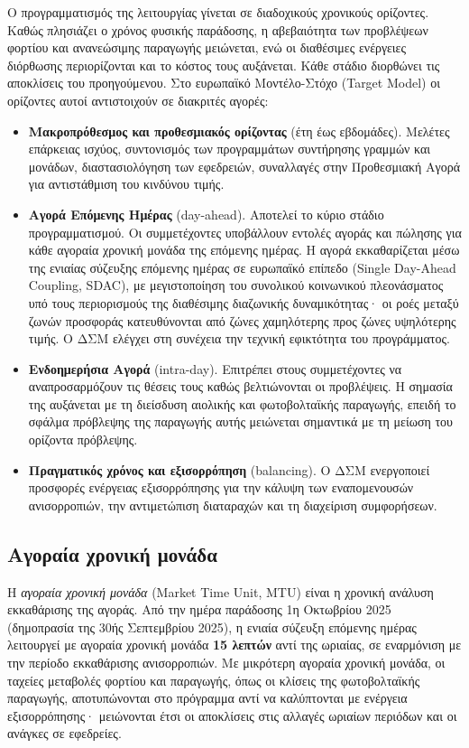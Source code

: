 Ο προγραμματισμός της λειτουργίας γίνεται σε διαδοχικούς χρονικούς ορίζοντες. Καθώς
πλησιάζει ο χρόνος φυσικής παράδοσης, η αβεβαιότητα των προβλέψεων φορτίου και ανανεώσιμης
παραγωγής μειώνεται, ενώ οι διαθέσιμες ενέργειες διόρθωσης περιορίζονται και το κόστος τους
αυξάνεται. Κάθε στάδιο διορθώνει τις αποκλίσεις του προηγούμενου. Στο ευρωπαϊκό
Μοντέλο-Στόχο (Target Model) οι ορίζοντες αυτοί αντιστοιχούν σε διακριτές αγορές:

\begin{itemize}
\item \textbf{Μακροπρόθεσμος και προθεσμιακός ορίζοντας} (έτη έως εβδομάδες). Μελέτες
      επάρκειας ισχύος, συντονισμός των προγραμμάτων συντήρησης γραμμών και μονάδων,
      διαστασιολόγηση των εφεδρειών, συναλλαγές στην Προθεσμιακή Αγορά για αντιστάθμιση
      του κινδύνου τιμής.
\item \textbf{Αγορά Επόμενης Ημέρας} (day-ahead). Αποτελεί το κύριο στάδιο
      προγραμματισμού. Οι συμμετέχοντες υποβάλλουν εντολές αγοράς και πώλησης για κάθε
      αγοραία χρονική μονάδα της επόμενης ημέρας. Η αγορά εκκαθαρίζεται μέσω της ενιαίας
      σύζευξης επόμενης ημέρας σε ευρωπαϊκό επίπεδο (Single Day-Ahead Coupling, SDAC), με
      μεγιστοποίηση του συνολικού κοινωνικού πλεονάσματος υπό τους περιορισμούς της
      διαθέσιμης διαζωνικής δυναμικότητας· οι ροές μεταξύ ζωνών προσφοράς κατευθύνονται
      από ζώνες χαμηλότερης προς ζώνες υψηλότερης τιμής. Ο ΔΣΜ ελέγχει στη συνέχεια την
      τεχνική εφικτότητα του προγράμματος.
\item \textbf{Ενδοημερήσια Αγορά} (intra-day). Επιτρέπει στους συμμετέχοντες να
      αναπροσαρμόζουν τις θέσεις τους καθώς βελτιώνονται οι προβλέψεις. Η σημασία της
      αυξάνεται με τη διείσδυση αιολικής και φωτοβολταϊκής παραγωγής, επειδή το σφάλμα
      πρόβλεψης της παραγωγής αυτής μειώνεται σημαντικά με τη μείωση του ορίζοντα
      πρόβλεψης.
\item \textbf{Πραγματικός χρόνος και εξισορρόπηση} (balancing). Ο ΔΣΜ ενεργοποιεί προσφορές
      ενέργειας εξισορρόπησης για την κάλυψη των εναπομενουσών ανισορροπιών, την
      αντιμετώπιση διαταραχών και τη διαχείριση συμφορήσεων.
\end{itemize}

\subsection{Αγοραία χρονική μονάδα}

Η \emph{αγοραία χρονική μονάδα} (Market Time Unit, MTU) είναι η χρονική ανάλυση εκκαθάρισης
της αγοράς. Από την ημέρα παράδοσης 1η Οκτωβρίου 2025 (δημοπρασία της 30ής Σεπτεμβρίου
2025), η ενιαία σύζευξη επόμενης ημέρας λειτουργεί με αγοραία χρονική μονάδα \textbf{15
λεπτών} αντί της ωριαίας, σε εναρμόνιση με την περίοδο εκκαθάρισης ανισορροπιών. Με
μικρότερη αγοραία χρονική μονάδα, οι ταχείες μεταβολές φορτίου και παραγωγής, όπως οι
κλίσεις της φωτοβολταϊκής παραγωγής, αποτυπώνονται στο πρόγραμμα αντί να καλύπτονται με
ενέργεια εξισορρόπησης· μειώνονται έτσι οι αποκλίσεις στις αλλαγές ωριαίων περιόδων και οι
ανάγκες σε εφεδρείες.


